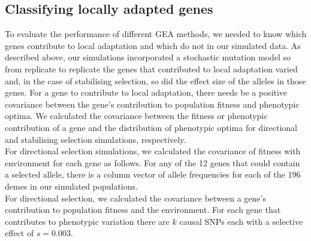 \documentclass[10pt,twoside,lineno, twocolumn]{GSA_format}
\newcommand{\bm}[1]{\mbox{\boldmath{$#1$}}}
\begin{document}
\subsection{Classifying locally adapted genes} 

To evaluate the performance of different GEA methods, we needed to know which genes contribute to local adaptation and which do not in our simulated data. As described above, our simulations incorporated a stochastic mutation model so from replicate to replicate the genes that contributed to local adaptation varied and, in the case of stabilising selection, so did the effect size of the alleles in those genes. For a gene to contribute to local adaptation, there needs be a positive covariance between the gene's contribution to population fitness and phenotypic optima. We calculated the covariance between the fitness or phenotypic contribution of a gene and the distribution of phenotypic optima for directional and stabilising selection simulations, respectively. \\

For directional selection simulations, we calculated the covariance of fitness with environment for each gene as follows. For any of the 12 genes that could contain a selected allele, there is a column vector of allele frequencies for each of the 196 demes in our simulated populations. \\

For directional selection, we calculated the covariance between a gene's contribution to population fitness and the environment. For each gene that contributes to phenotypic variation there are $k$ causal SNPs each with a selective effect of $s = 0.003$. \\


\end{document}
